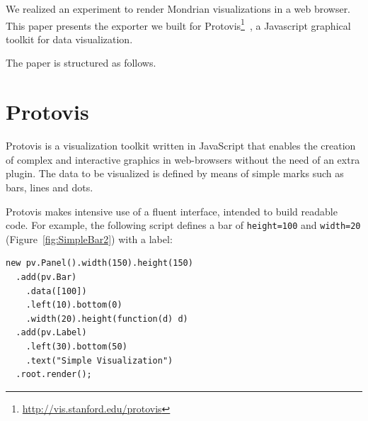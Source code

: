 \documentclass[preprint,10pt]{sigplanconf}
\newcommand{\ct}{\lstinline[backgroundcolor=\color{white},basicstyle=\footnotesize\ttfamily]}
\newcommand{\seclabel}[1]{\label{sec:#1}}
\newcommand{\secref}[1]{Section~\ref{sec:#1}\xspace}
\newcommand{\figref}[1]{Figure~\ref{fig:#1}\xspace}
\begin{document}
We realized an experiment to render Mondrian visualizations in a web browser. This paper presents the exporter we built for Protovis\footnote{\url{http://vis.stanford.edu/protovis}}~\cite{Bost09a}, a Javascript graphical toolkit for data visualization.






The paper is structured as follows.



%

\section{Protovis} \seclabel{protovis}
Protovis is a visualization toolkit written in JavaScript that enables the creation of complex and interactive graphics in web-browsers without the need of an extra plugin. The data to be visualized is defined by means of simple marks such as bars, lines and dots. 

Protovis makes intensive use of a fluent interface, intended to build readable code. For example, the following script defines a bar of \ct{height=100} and \ct{width=20} (\figref{SimpleBar2}) with a label:

\begin{lstlisting} 
new pv.Panel().width(150).height(150)
  .add(pv.Bar)
    .data([100])
    .left(10).bottom(0)
    .width(20).height(function(d) d)
  .add(pv.Label)
    .left(30).bottom(50)
    .text("Simple Visualization")
  .root.render();
\end{lstlisting}
\end{document}
